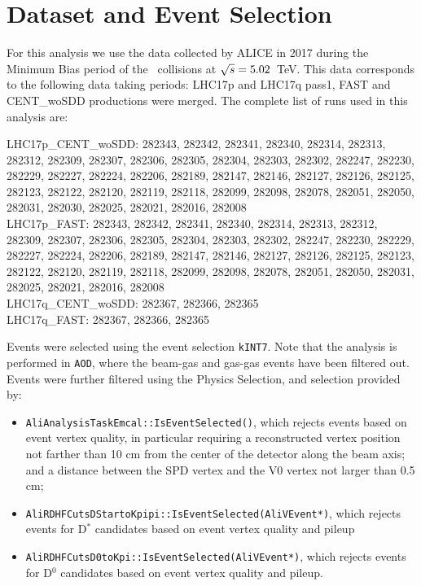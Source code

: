 
\section{Dataset and Event Selection}

For this analysis we use the data collected by ALICE in 2017 during the Minimum Bias period of the \pp\ collisions at $\sqrt{s}=5.02$~TeV. This data corresponds to the following data taking periods:
LHC17p and LHC17q pass1, FAST and CENT\_woSDD productions were merged.
The complete list of runs used in this analysis are:

LHC17p\_CENT\_woSDD: 282343, 282342, 282341, 282340, 282314, 282313, 282312, 282309, 282307, 282306, 282305, 282304, 282303, 282302, 282247, 282230, 282229, 282227, 282224, 282206, 282189, 282147, 282146, 282127, 282126, 282125, 282123, 282122, 282120, 282119, 282118, 282099, 282098, 282078, 282051, 282050, 282031, 282030, 282025, 282021, 282016, 282008 \\
LHC17p\_FAST: 282343, 282342, 282341, 282340, 282314, 282313, 282312, 282309, 282307, 282306, 282305, 282304, 282303, 282302, 282247, 282230, 282229, 282227, 282224, 282206, 282189, 282147, 282146, 282127, 282126, 282125, 282123, 282122, 282120, 282119, 282118, 282099, 282098, 282078, 282051, 282050, 282031, 282025, 282021, 282016, 282008 \\
LHC17q\_CENT\_woSDD: 282367, 282366, 282365 \\
LHC17q\_FAST: 282367, 282366, 282365

Events were selected using the event selection \texttt{kINT7}. Note that the analysis is performed in \texttt{AOD}, where the beam-gas and gas-gas events have been filtered out.
Events were further filtered using the Physics Selection, and selection provided by:
\begin{itemize}
\item \texttt{AliAnalysisTaskEmcal::IsEventSelected()}, which rejects events based on event vertex quality, in particular requiring a reconstructed vertex position not farther than 10 cm from the center of the detector along the beam axis; and a distance between the SPD vertex and the V0 vertex not larger than 0.5 cm;
\item \texttt{AliRDHFCutsDStartoKpipi::IsEventSelected(AliVEvent*)}, which rejects events for D$^*$ candidates based on event vertex quality and pileup
\item \texttt{AliRDHFCutsD0toKpi::IsEventSelected(AliVEvent*)}, which rejects events for D$^0$ candidates based on event vertex quality and pileup.
\end{itemize}

